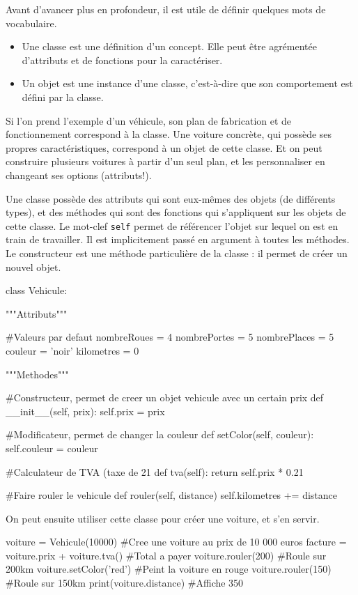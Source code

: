 Avant d’avancer plus en profondeur, il est utile de définir quelques mots de vocabulaire.
\begin{itemize}
    \item Une classe est une définition d’un concept. Elle peut être agrémentée d’attributs et de
fonctions pour la caractériser.
    \item Un objet est une instance d’une classe, c'est-à-dire que son comportement est défini par la
classe.
\end{itemize}

Si l’on prend l’exemple d’un véhicule, son plan de fabrication et de fonctionnement correspond à la classe.
Une voiture concrète, qui possède ses propres caractéristiques, correspond à un objet de cette classe. Et on peut construire plusieurs voitures à partir d'un seul plan, et les personnaliser en changeant ses options (attributs!).

Une classe possède des attributs qui sont eux-mêmes des objets (de différents types), et des méthodes qui sont des fonctions qui s'appliquent sur les objets de cette classe.
Le mot-clef \texttt{self} permet de référencer l'objet sur lequel on est en train de travailler.
Il est implicitement passé en argument à toutes les méthodes.
Le constructeur est une méthode particulière de la classe : il permet de créer un nouvel objet.

\begin{python}[caption = Exemple de classe]
class Vehicule:

    """Attributs"""
    
    #Valeurs par defaut
    nombreRoues = 4
    nombrePortes = 5
    nombrePlaces = 5
    couleur = 'noir'
    kilometres = 0
    
    """Methodes"""
    
    #Constructeur, permet de creer un objet vehicule avec un certain prix
    def __init__(self, prix):
        self.prix = prix
    
    #Modificateur, permet de changer la couleur
    def setColor(self, couleur):
        self.couleur = couleur
        
    #Calculateur de TVA (taxe de 21%
    def tva(self):
        return self.prix * 0.21
    
    #Faire rouler le vehicule
    def rouler(self, distance)
        self.kilometres += distance
\end{python}

On peut ensuite utiliser cette classe pour créer une voiture, et s'en servir.

\begin{python}[caption = Exemple de classe]
voiture = Vehicule(10000)              #Cree une voiture au prix de 10 000 euros
facture = voiture.prix + voiture.tva() #Total a payer
voiture.rouler(200)                    #Roule sur 200km
voiture.setColor('red')                #Peint la voiture en rouge
voiture.rouler(150)                    #Roule sur 150km
print(voiture.distance)                #Affiche 350
\end{python}